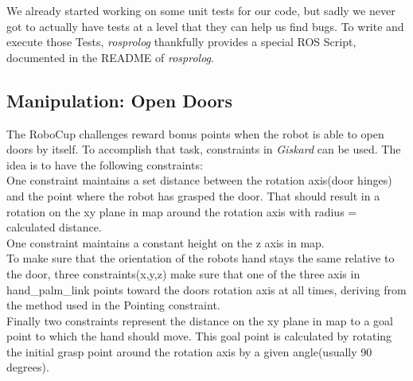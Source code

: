 \documentclass[main.tex]{subfiles}
\begin{document}
		We already started working on some unit tests for our code, but sadly we never got to actually have tests at a level that they can help us find bugs. To write and execute those Tests, \textit{rosprolog} thankfully provides a special ROS Script, documented in the README of \textit{rosprolog}.


		
		\subsection{Manipulation: Open Doors}
		The RoboCup challenges reward bonus points when the robot is able to open doors by itself. To accomplish that task, constraints in \textit{Giskard} can be used. The idea is to have the following constraints:\\
		One constraint maintains a set distance between the rotation axis(door hinges) and the point where the robot has grasped the door. That should result in a rotation on the xy plane in map around the rotation axis with radius = calculated distance.\\
		One constraint maintains a constant height on the z axis in map.\\
		To make sure that the orientation of the robots hand stays the same relative to the door, three constraints(x,y,z) make sure that one of the three axis in hand\_palm\_link points toward the doors rotation axis at all times, deriving from the method used in the Pointing constraint.\\
		Finally two constraints represent the distance on the xy plane in map to a goal point to which the hand should move. This goal point is calculated by rotating the initial grasp point around the rotation axis by a given angle(usually 90 degrees).
		
		
		
	\endgroup
\end{document}
